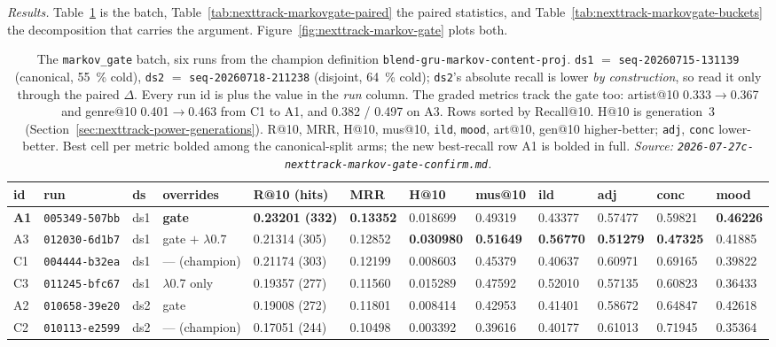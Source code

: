 \documentclass[11pt]{article}
\newcommand{\runid}[1]{\texttt{\small\seqsplit{#1}}}
\newcommand{\dsid}[1]{\texttt{\small #1}}
\newcommand{\best}[1]{\textbf{#1}}
\begin{document}
\emph{Results.} Table~\ref{tab:nexttrack-markovgate} is the batch,
Table~\ref{tab:nexttrack-markovgate-paired} the paired statistics, and
Table~\ref{tab:nexttrack-markovgate-buckets} the decomposition that carries the argument.
Figure~\ref{fig:nexttrack-markov-gate} plots both.

\begin{table}[ht]
  \centering
  \caption{The \texttt{markov\_gate} batch, six runs from the champion definition
  \texttt{blend-gru-markov-content-proj}. \dsid{ds1} $=$
  \dsid{seq-20260715-131139} (canonical, \SI{55}{\percent} cold), \dsid{ds2} $=$
  \dsid{seq-20260718-211238} (disjoint, \SI{64}{\percent} cold);
  \dsid{ds2}'s absolute recall is lower \emph{by construction}, so read it only
  through the paired $\Delta$. Every run id is \protect\runid{run-20260728-} plus
  the value in the \emph{run} column. The graded metrics track the gate too:
  artist@10 \num{0.333}$\to$\num{0.367} and genre@10 \num{0.401}$\to$\num{0.463}
  from C1 to A1, and \num{0.382} / \num{0.497} on A3.
  Rows sorted by Recall@10. H@10 is generation~3
  (Section~\ref{sec:nexttrack-power-generations}). R@10, MRR, H@10, mus@10, \texttt{ild},
  \texttt{mood}, art@10, gen@10 higher-better; \texttt{adj}, \texttt{conc}
  lower-better. Best cell per metric bolded among the canonical-split arms; the
  new best-recall row A1 is bolded in full.
  \emph{Source: \texttt{2026-07-27c-nexttrack-markov-gate-confirm.md}.}}
  \label{tab:nexttrack-markovgate}
  {\scriptsize\setlength{\tabcolsep}{1.9pt}\begin{tabular}{llllllllllll}
    \toprule
    id & run & ds & overrides & R@10 (hits) & MRR & H@10 & mus@10 & ild & adj & conc & mood \\
    \midrule
    \best{A1} & \texttt{005349-507bb} & ds1 & \best{gate} & \best{0.23201 (332)} & \best{0.13352} & 0.018699 & 0.49319 & 0.43377 & 0.57477 & 0.59821 & \best{0.46226} \\
    A3 & \texttt{012030-6d1b7} & ds1 & gate $+$ $\lambda$0.7 & 0.21314 (305) & 0.12852 & \best{0.030980} & \best{0.51649} & \best{0.56770} & \best{0.51279} & \best{0.47325} & 0.41885 \\
    C1 & \texttt{004444-b32ea} & ds1 & --- (champion) & 0.21174 (303) & 0.12199 & 0.008603 & 0.45379 & 0.40637 & 0.60971 & 0.69165 & 0.39822 \\
    C3 & \texttt{011245-bfc67} & ds1 & $\lambda$0.7 only & 0.19357 (277) & 0.11560 & 0.015289 & 0.47592 & 0.52010 & 0.57135 & 0.60823 & 0.36433 \\
    A2 & \texttt{010658-39e20} & ds2 & gate & 0.19008 (272) & 0.11801 & 0.008414 & 0.42953 & 0.41401 & 0.58672 & 0.64847 & 0.42618 \\
    C2 & \texttt{010113-e2599} & ds2 & --- (champion) & 0.17051 (244) & 0.10498 & 0.003392 & 0.39616 & 0.40177 & 0.61013 & 0.71945 & 0.35364 \\
    \bottomrule
  \end{tabular}}
\end{table}
\end{document}
